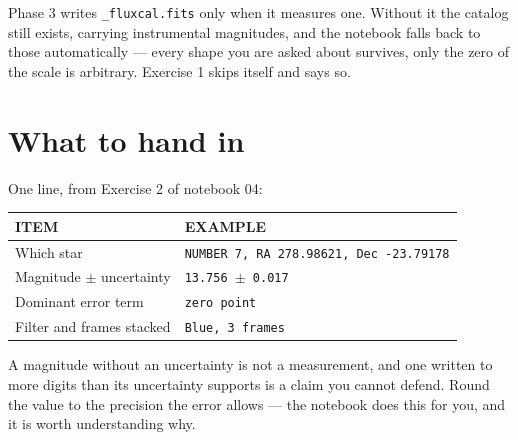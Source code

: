 \documentclass[11pt,a4paper]{article}
\newcommand{\cm}[1]{\texttt{\small #1}}
\newcommand{\thead}[1]{{\sffamily\bfseries\scriptsize\color{inkfaint}\MakeUppercase{#1}}}
\begin{document}
\begin{caution}
Phase 3 writes \cm{\_fluxcal.fits} only when it measures one. Without it the catalog still
exists, carrying instrumental magnitudes, and the notebook falls back to those automatically
--- every shape you are asked about survives, only the zero of the scale is arbitrary.
Exercise 1 skips itself and says so.
\end{caution}

\section{What to hand in}
One line, from Exercise 2 of notebook 04:

\vspace{4pt}
\begin{tabularx}{\textwidth}{@{}p{5.4cm}X@{}}
\toprule
\thead{Item} & \thead{Example} \\
\midrule
Which star & \cm{NUMBER 7, RA 278.98621, Dec -23.79178} \\
Magnitude $\pm$ uncertainty & \cm{13.756 $\pm$ 0.017} \\
Dominant error term & \cm{zero point} \\
Filter and frames stacked & \cm{Blue, 3 frames} \\
\bottomrule
\end{tabularx}

\begin{note}
A magnitude without an uncertainty is not a measurement, and one written to more digits than
its uncertainty supports is a claim you cannot defend. Round the value to the precision the
error allows --- the notebook does this for you, and it is worth understanding why.
\end{note}

\end{document}
